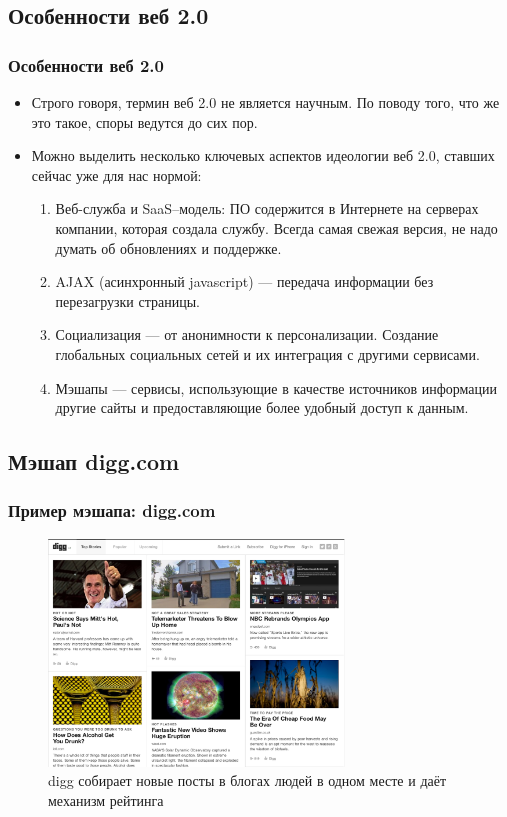 \documentclass[compress,red]{beamer}
\begin{document}
\subsection{Особенности веб 2.0}
\begin{frame}
\frametitle{Особенности веб 2.0}
		\begin{itemize}
		\item Строго говоря, термин веб 2.0 не является научным. По поводу того, что же это такое, споры ведутся до сих пор.
		\item Можно выделить несколько ключевых аспектов идеологии веб 2.0, ставших сейчас уже для нас нормой:
		  \begin{enumerate}
		    \item Веб-служба и SaaS--модель: ПО содержится в Интернете на серверах компании, которая создала службу. Всегда самая свежая версия, не надо думать об обновлениях и поддержке.
		    \item AJAX (асинхронный javascript) --- передача информации без перезагрузки страницы.
		    \item Социализация --- от анонимности к персонализации. Создание глобальных социальных сетей и их интеграция с другими сервисами.
		    \item Мэшапы --- сервисы, использующие в качестве источников информации другие сайты и предоставляющие более удобный доступ к данным.
		  \end{enumerate}
		\end{itemize}
\end{frame}

\subsection{Мэшап digg.com}
\begin{frame}
  \frametitle{Пример мэшапа: digg.com}
	  \begin{figure}
	    \includegraphics[width=0.7\textwidth]{images/digg.png}
	    \caption{digg собирает новые посты в блогах людей в одном месте и даёт механизм рейтинга}
	  \end{figure}
\end{frame}
\end{document}
